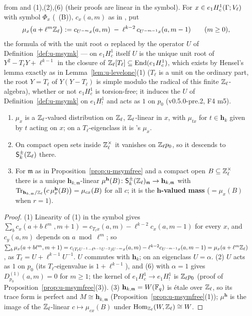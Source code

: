 \documentclass[11pt]{article}
\newcommand{\hcusp}{\mathbf{h}}                   %
\newcommand{\Zl}{\Z_\ell}
\begin{document}
\begin{lemma}[The ball masses on $\mathsf S_k$, and their $\hcusp$-valued form]\label{lem:u-msymmass}
\PROVED{} from  and (1),(2),(6) (their proofs are linear in the symbol). For $x\in e_1H^{1}_c(\Gamma;V_\ell)$ with symbol $\Phi_x$
(~(B)), $c_x(a,m)$ as in , put
\[
  \mu_x\bigl(a+\ell^{m}\Zl\bigr):=c_{U^{-m}x}(a,m)\;-\;\ell^{k-2}\,c_{U^{-m-1}x}(a,m-1)\qquad(m\ge0),
\]
the formula of  with the unit root $\alpha$ replaced by the operator $U$ of Definition~\ref{def:u-msymk} --- on $e_1H^{1}_c$ itself $U$ is the unique unit root of
$Y^{2}-T_\ell Y+\ell^{k-1}$ in the closure of $\Zl[T_\ell]\subseteq\End(e_1H^{1}_c)$, which exists by Hensel's lemma exactly as in Lemma~\ref{lem:u-levelone}(1) ($T_\ell$ is a unit on the
ordinary part, the root $Y=T_\ell$ of $Y(Y-T_\ell)$ is simple modulo the radical of this finite $\Zl$-algebra), whether or not $e_1H^{1}_c$ is torsion-free; it induces the $U$ of
Definition~\ref{def:u-msymk} on $e_1H^{1}_{!}$ and acts as $1$ on $p_0$ (v0.5.0-pre.2, F4 m5).
\begin{enumerate}
\item $\mu_x$ is a $\Zl$-valued distribution on $\Zl$, $\Zl$-linear in $x$, with $\mu_{tx}$ for $t\in\hcusp_k$ given by $t$ acting on $x$; on a $T_\ell$-eigenclass it is 's $\mu_x$.
\item On compact open sets inside $\Zl^{\times}$ it vanishes on $\Zl p_0$, so it descends to $\mathsf S^{\pm}_k(\Zl)$ there.
\item For $\mathfrak m$ as in Proposition~\ref{prop:u-msymfree} and a compact open $B\subseteq\Zl^{\times}$ there is a unique $\hcusp_{k,\mathfrak m}$-linear $\mu^{\hcusp}(B)\colon\mathsf S^{\pm}_k(\Zl)_{\mathfrak m}\to
  \hcusp_{k,\mathfrak m}$ with $\mathrm{Tr}_{\hcusp_{k,\mathfrak m}/\Zl}\bigl(c\,\mu^{\hcusp}_x(B)\bigr)=\mu_{cx}(B)$ for all $c$; it is the \textbf{$\hcusp$-valued mass} ($=\mu_x(B)$ when $r=1$).
\end{enumerate}
\end{lemma}

\begin{proof}
(1) Linearity of (1) in the symbol gives $\sum_bc_x(a+b\ell^{m},m+1)=c_{T_\ell x}(a,m)-\ell^{k-2}c_x(a,m-1)$ for every $x$, and $c_y(a,m)$ depends on $a\bmod\ell^{m}$; so
$\sum_b\mu_x(a+b\ell^{m},m+1)=c_{(T_\ell U^{-1}-\ell^{k-1}U^{-2})U^{-m}x}(a,m)-\ell^{k-2}c_{U^{-m-1}x}(a,m-1)=\mu_x(a+\ell^{m}\Zl)$, as $T_\ell=U+\ell^{k-1}U^{-1}$. $U$ commutes with
$\hcusp_k$; on an eigenclass $U=\alpha$. (2) $U$ acts as $1$ on $p_0$ (its $T_\ell$-eigenvalue is $1+\ell^{k-1}$), and (6) with $\alpha=1$ gives $D^{(1)}_{p_0}(a,m)=0$
for $m\ge1$; the kernel of $e_1H^{1}_c\to e_1H^{1}_{!}$ is $\Zl p_0$ (proof of Proposition~\ref{prop:u-msymfree}(3)). (3) $\hcusp_{k,\mathfrak m}=W(\F_q)$ is étale over $\Zl$, so its trace form is perfect
and $M\cong\hcusp_{k,\mathfrak m}$ (Proposition~\ref{prop:u-msymfree}(1)); $\mu^{\hcusp}$ is the image of the $\Zl$-linear $c\mapsto\mu_{cx}(B)$ under $\Hom_{\Zl}(W,\Zl)\cong W$.
\end{proof}
\end{document}
